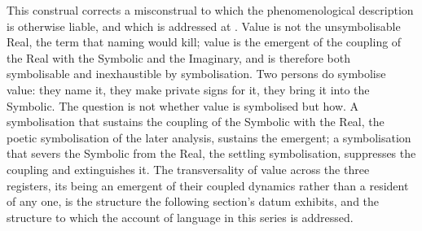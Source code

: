 This construal corrects a misconstrual to which the phenomenological description is otherwise liable, and which is addressed at . Value is not the unsymbolisable Real, the term that naming would kill; value is the emergent of the coupling of the Real with the Symbolic and the Imaginary, and is therefore both symbolisable and inexhaustible by symbolisation. Two persons do symbolise value: they name it, they make private signs for it, they bring it into the Symbolic. The question is not whether value is symbolised but how. A symbolisation that sustains the coupling of the Symbolic with the Real, the poetic symbolisation of the later analysis, sustains the emergent; a symbolisation that severs the Symbolic from the Real, the settling symbolisation, suppresses the coupling and extinguishes it. The transversality of value across the three registers, its being an emergent of their coupled dynamics rather than a resident of any one, is the structure the following section's datum exhibits, and the structure to which the account of language in this series is addressed.
